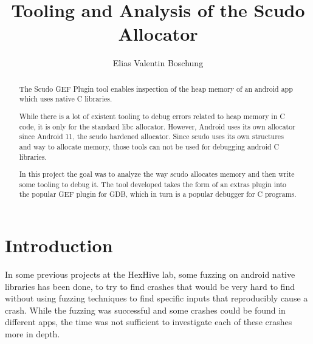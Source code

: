 \documentclass[a4paper,11pt,oneside]{report}
\title{Tooling and Analysis of the Scudo Allocator}
\author{Elias Valentin Boschung}
\newcommand{\sysname}{Scudo GEF Plugin\xspace}
\begin{document}
\maketitle{}
\dedication{Dedicated to my study companion since Covid-19, my plush bear.}
\makededication{}
\makeacks{}

\begin{abstract}
The \sysname{} tool enables inspection of the heap memory of an android app
which uses native C libraries.

While there is a lot of existent tooling to debug errors related to heap
memory in C code, it is only for the standard libc allocator. However,
Android uses its own allocator since Android 11, the scudo hardened
allocator. Since scudo uses its own structures and way to allocate memory,
those tools can not be used for debugging android C libraries.

In this project the goal was to analyze the way scudo allocates memory and
then write some tooling to debug it. The tool developed takes the form of
an extras plugin into the popular GEF plugin for GDB, which in turn is a
popular debugger for C programs.
\end{abstract}

\maketoc{}

\chapter{Introduction}

In some previous projects at the HexHive lab, some fuzzing on android native
libraries has been done, to try to find crashes that would be very hard to
find without using fuzzing techniques to find specific inputs that reproducibly
cause a crash. While the fuzzing was successful and some crashes could be found
in different apps, the time was not sufficient to investigate each of these
crashes more in depth.
\end{document}
